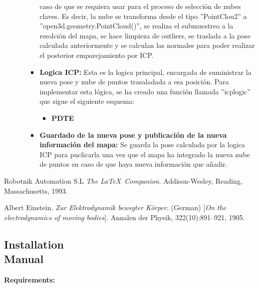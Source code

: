 \documentclass[12pt, a4paper, twoside]{article}
\begin{document}
\begin{itemize}
\begin{itemize}
\begin{itemize}
      caso de que se requiera usar para el proceso de selección de nubes claves. Es decir, la nube se transforma desde el tipo ''PointClou2'' a 
      ''open3d.geometry.PointCloud()'', se realiza el submuestreo a la resolción del mapa, se hace limpieza de outliers, se traslada a la pose calculada anteriormente y 
      se calculan las normales para poder realizar el posterior emparejamiento por ICP.
      \item \textbf{Logica ICP:} Esta es la logica principal, encargada de suministrar la nueva pose y nube de puntos trasaladada a esa posición. Para implementar esta 
      lógica, se ha creado una función llamada ''icp\textunderscore logic'' que sigue el siguiente esquema:
      \begin{itemize}
        \item \textbf{PDTE} 
      \end{itemize}
      \item \textbf{Guardado de la nueva pose y publicación de la nueva información del mapa:} Se guarda la pose calculada por la logica ICP para puclicarla una vez que el 
      mapa ha integrado la nueva nube de puntos en caso de que haya nueva información que añadir.
    \end{itemize}
  \end{itemize}
\end{itemize}

\begin{thebibliography}{9}
    Robotnik Automation S.L
    \textit{The \LaTeX\ Companion}. 
    Addison-Wesley, Reading, Massachusetts, 1993.
    
    Albert Einstein. 
    \textit{Zur Elektrodynamik bewegter K{\"o}rper}. (German) 
    [\textit{On the electrodynamics of moving bodies}]. 
    Annalen der Physik, 322(10):891–921, 1905.
\end{thebibliography}

\newpage

\begin{umaappendices}
\section{Installation \\ Manual}
    
    \textbf{\large{Requirements:}}

\end{umaappendices}
\end{document}
